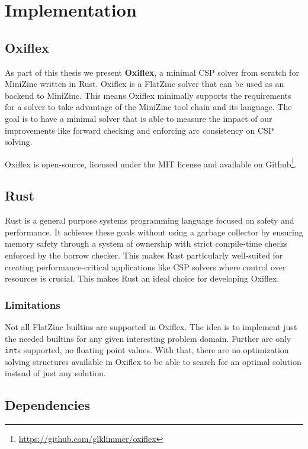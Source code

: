 \chapter{Implementation} \label{chap:impl}

\section{Oxiflex}

As part of this thesis we present \textbf{Oxiflex}, a minimal CSP solver from scratch for MiniZinc written in Rust. Oxiflex is a FlatZinc solver that can be used as an backend to MiniZinc. This means Oxiflex minimally supports the requirements for a solver to take advantage of the MiniZinc tool chain and its language. The goal is to have a minimal solver that is able to measure the impact of our improvements like forward checking and enforcing arc consistency on CSP solving.

Oxiflex is open-source, licensed under the MIT license and available on Github\footnote{\url{https://github.com/glklimmer/oxiflex}}.

\section{Rust}

Rust \cite{rust:2014} is a general purpose systems programming language focused on safety and performance. It achieves these goals without using a garbage collector by ensuring memory safety through a system of ownership with strict compile-time checks enforced by the borrow checker. This makes Rust particularly well-suited for creating performance-critical applications like CSP solvers where control over resources is crucial. This makes Rust an ideal choice for developing Oxiflex.

\subsection{Limitations}

Not all FlatZinc builtins are supported in Oxiflex. The idea is to implement just the needed builtins for any given interesting problem domain. Further are only \verb|int|s supported, no floating point values. With that, there are no optimization solving structures available in Oxiflex to be able to search for an optimal solution instead of just any solution.

\section{Dependencies}

